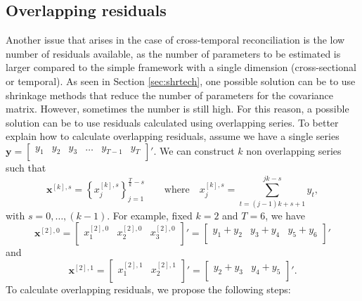 \documentclass[a4paper,11pt]{article}
\newcommand{\xvet}{\bm{x}}
\newcommand{\yvet}{\bm{y}}
\theoremstyle{definition}
\begin{document}
\subsection{Overlapping residuals}\label{ssec:over_res}

Another issue that arises in the case of cross-temporal reconciliation is the low number of residuals available, as the number of parameters to be estimated is larger compared to the simple framework with a single dimension (cross-sectional or temporal). As seen in Section \ref{sec:shrtech}, one possible solution can be to use shrinkage methods that reduce the number of parameters for the covariance matrix. However, sometimes the number is still high. For this reason, a possible solution can be to use residuals calculated using overlapping series. To better explain how to calculate overlapping residuals, assume we have a single series
	$
	\yvet = \begin{bmatrix}
		y_1 & y_2 & y_3 & \dots & y_{T-1} & y_{T} \\
	\end{bmatrix}'.
	$
	We can construct $k$ non overlapping series such that
	$$
	\xvet^{[k], s} = \left\{x^{[k],s}_{j}\right\}_{j = 1}^{\frac{T}{k}-s} \qquad \mathrm{where} \quad x^{[k],s}_{j} = \sum_{t = (j-1)k+s+1}^{jk-s} y_t,
	$$ 
	with $s = 0, \dots, (k-1)$.
	For example, fixed $k = 2$ and $T = 6$, we have
	$$
	\xvet^{[2], 0} = \begin{bmatrix}
		x_1^{[2], 0} & x_2^{[2], 0} & x_{3}^{[2], 0}\\
	\end{bmatrix}' =\begin{bmatrix}
		y_1 + y_2 & y_3 + y_4 & y_5 + y_6\\
	\end{bmatrix}'
	$$
	and
	$$
	\xvet^{[2], 1} = \begin{bmatrix}
		x_1^{[2], 1} & x_2^{[2], 1}\\
	\end{bmatrix}' =\begin{bmatrix}
		y_2 + y_3 & y_4 + y_5\\
	\end{bmatrix}'.
	$$
To calculate overlapping residuals, we propose the following steps:
\end{document}
